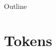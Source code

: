 \documentclass[10pt]{beamer}
\begin{document}
\begin{frame}{Outline}
\tableofcontents
\end{frame}




\section{Tokens}
\end{document}
